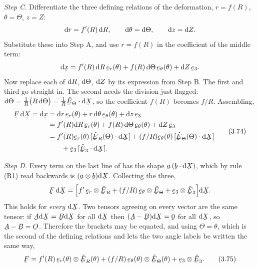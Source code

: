 \smallskip
\emph{Step C.} Differentiate the three defining relations of the
deformation, $r=f(R)$, $\theta=\Theta$, $z=Z$:
\[
   \mathrm{d} r=f'(R)\,\mathrm{d} R,\qquad \mathrm{d}\theta=\mathrm{d}\Theta,\qquad \mathrm{d} z=\mathrm{d} Z .
\]
Substitute these into Step A, and use $r=f(R)$ in the coefficient of the
middle term:
\[
   \dl\bx=f'(R)\,\dl R\,\ber(\theta)+f(R)\,\dl\Theta\,\bet(\theta)
          +\dl Z\,\be_{3}.
\]
Now replace each of $\mathrm{d} R$, $\mathrm{d}\Theta$, $\mathrm{d} Z$ by its expression from
Step B. The first and third go straight in. The second needs the division
just flagged: $\dl\Theta=\tfrac1R\big(R\,\dl\Theta\big)
=\tfrac1R\ip{\hETh}{\dl\bX}$, so the coefficient $f(R)$ becomes $f/R$.
Assembling,
\begin{equation}
\begin{aligned}
   \bF\,\dl\bX=\dl\bx
   &=\dl r\,\ber(\theta)+r\,\dl\theta\,\bet(\theta)+\dl z\,\be_{3}\\
   &=f'(R)\dl R\,\ber(\theta)+f(R)\,\dl\Theta\,\bet(\theta)+\dl Z\,\be_{3}\\
   &=f'(R)\ber(\theta)\,[\ip{\hER(\Theta)}{\dl\bX}]
    +(f/R)\bet(\theta)\,[\ip{\hETh(\Theta)}{\dl\bX}]\\
   &\qquad+\be_{3}\,[\ip{\hbE_{3}}{\dl\bX}].
\end{aligned}
   \tag{3.74}\label{eq:3.74}
\end{equation}

\smallskip
\emph{Step D.} Every term on the last line of  has the shape
$\ba\,(\ip{\bb}{\dl\bX})$, which by rule (R1) read backwards is
$(\ba\otimes\bb)\dl\bX$. Collecting the three,
\[
   \bF\,\dl\bX=\Big[f'\,\ber\otimes\hER
     +(f/R)\,\bet\otimes\hETh+\be_{3}\otimes\hbE_{3}\Big]\dl\bX .
\]
This holds for \emph{every} $\dl\bX$. Two tensors agreeing on every vector
are the same tensor: if $\bA\dl\bX=\bB\dl\bX$ for all $\dl\bX$ then
$(\bA-\bB)\dl\bX=\bze$ for all $\dl\bX$, so $\bA-\bB=\Ob$. Therefore the
brackets may be equated, and using $\Theta=\theta$, which is the second of
the defining relations and lets the two angle labels be written the same
way,
\begin{equation}
   \bF=f'(R)\,\ber(\theta)\otimes\hER(\theta)
      +(f/R)\,\bet(\theta)\otimes\hETh(\theta)
      +\be_{3}\otimes\hbE_{3}.
   \tag{3.75}\label{eq:3.75}
\end{equation}

